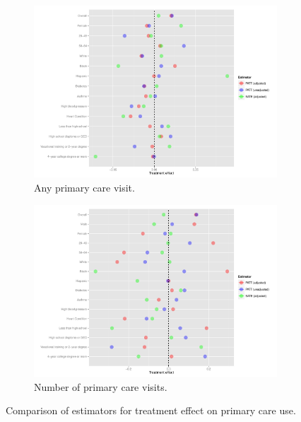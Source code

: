 \documentclass[12pt]{article}
\begin{document}
\begin{figure} [htb]
\begin{center}
     \begin{subfigure}[b]{0.86\textwidth}
    \includegraphics[width=\textwidth]{any-out-plot.pdf}
    \caption{Any primary care visit.}
    \label{fig:any-out-plot}
  \end{subfigure}
    \begin{subfigure}[b]{0.86\textwidth}
    \includegraphics[width=\textwidth]{num-out-plot.pdf}
    \caption{Number of primary care visits.}
    \label{fig:num-out-plot}
  \end{subfigure}
  \caption{Comparison of estimators for treatment effect on primary care use.}
   \end{center}
\end{figure}
\end{document}
